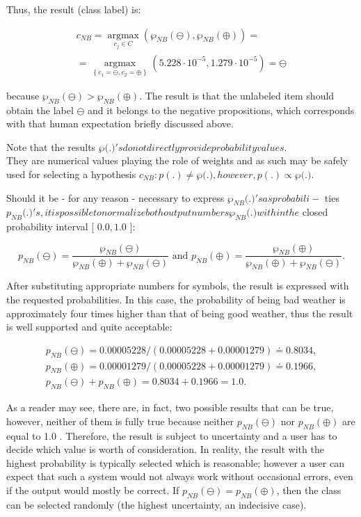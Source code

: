 \documentclass[10pt]{book}
\begin{document}
Thus, the result (class label) is:

$$
\begin{gathered}
c_{N B}=\underset{c_{j} \in C}{\operatorname{argmax}}\left(\wp_{N B}(\ominus), \wp_{N B}(\oplus)\right)= \\
=\underset{\left\{c_{1}=\ominus, c_{2}=\oplus\right\}}{\operatorname{argmax}}\left(5.228 \cdot 10^{-5}, 1.279 \cdot 10^{-5}\right)=\ominus
\end{gathered}
$$

because $\wp_{N B}(\ominus)>\wp_{N B}(\oplus)$. The result is that the unlabeled item should obtain the label $\ominus$ and it belongs to the negative propositions, which corresponds with that human expectation briefly discussed above.

Note that the results $\wp($.$) 's do not directly provide probability values.$\\
They are numerical values playing the role of weights and as such may be safely used for selecting a hypothesis $c_{N B}: p(.) \neq \wp($.$) , however, p(.) \propto \wp($.$) .$

Should it be - for any reason - necessary to express $\wp_{N B}($.$) 's as probabili-$ ties $p_{N B}($.$) 's, it is possible to normalize both output numbers \wp_{N B}($.$) within the$ closed probability interval [ $0.0,1.0$ ]:

$$
p_{N B}(\ominus)=\frac{\wp_{N B}(\ominus)}{\wp_{N B}(\oplus)+\wp_{N B}(\ominus)} \text { and } p_{N B}(\oplus)=\frac{\wp_{N B}(\oplus)}{\wp_{N B}(\oplus)+\wp_{N B}(\ominus)} .
$$

After substituting appropriate numbers for symbols, the result is expressed with the requested probabilities. In this case, the probability of being bad weather is approximately four times higher than that of being good weather, thus the result is well supported and quite acceptable:

$$
\begin{gathered}
p_{N B}(\ominus)=0.00005228 /(0.00005228+0.00001279) \doteq 0.8034, \\
p_{N B}(\oplus)=0.00001279 /(0.00005228+0.00001279) \doteq 0.1966, \\
p_{N B}(\ominus)+p_{N B}(\oplus)=0.8034+0.1966=1.0 .
\end{gathered}
$$

As a reader may see, there are, in fact, two possible results that can be true, however, neither of them is fully true because neither $p_{N B}(\ominus)$ nor $p_{N B}(\oplus)$ are equal to 1.0 . Therefore, the result is subject to uncertainty and a user has to decide which value is worth of consideration. In reality, the result with the highest probability is typically selected which is reasonable; however a user can expect that such a system would not always work without occasional errors, even if the output would mostly be correct. If $p_{N B}(\ominus)=p_{N B}(\oplus)$, then the class can be selected randomly (the highest uncertainty, an indecisive case).
\end{document}
